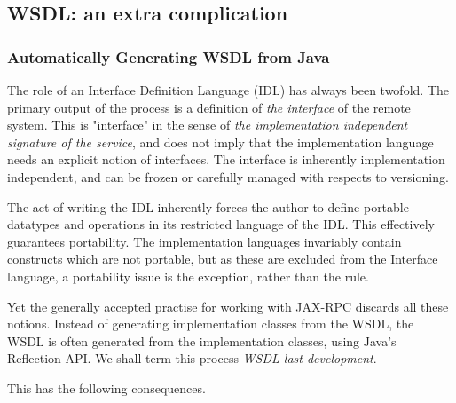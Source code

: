\subsection{WSDL: an extra complication}
\subsubsection{Automatically Generating WSDL from Java}
\label{objections:o-x:wsdl-gen}

The role of an Interface Definition Language (IDL) has always been
twofold. The primary output of the process is a definition of \emph{the
interface} of the remote system. This is "interface" in the sense of
\emph{the implementation independent signature of the service}, and does
not imply that the implementation language needs an explicit notion of
interfaces. The interface is inherently implementation independent, and
can be frozen or carefully managed with respects to versioning.

The act of writing the IDL inherently forces the author to define 
portable datatypes and operations in its restricted language of the IDL.
This effectively guarantees portability. The implementation languages
invariably contain constructs which are not portable, but as these are
excluded from the Interface language, a portability issue is the
exception, rather than the rule.

Yet the generally accepted practise for working with JAX-RPC discards
all these notions. Instead of generating implementation classes from the
WSDL, the WSDL is often generated from the implementation classes, using
Java's Reflection API. We shall term this process \emph{WSDL-last development}.

This has the following consequences. 

